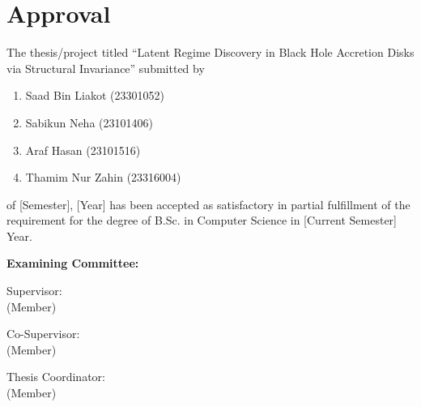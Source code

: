 \section*{Approval}

The thesis/project titled “Latent Regime Discovery in Black Hole Accretion Disks via Structural Invariance” submitted by 
\begin{enumerate}
  \item Saad Bin Liakot (23301052)
  \item Sabikun Neha (23101406)
  \item Araf Hasan (23101516)
  \item Thamim Nur Zahin (23316004)
\end{enumerate}

of [Semester], [Year] has been accepted as satisfactory in partial fulfillment of the requirement for the degree of B.Sc. in Computer Science in [Current Semester] Year. 

\vspace{0.5cm}
\textbf{Examining Committee:}

\vspace{1cm}

Supervisor:\\
(Member)
\begin{center}
    \hspace{7cm}  \hspace{1cm} 
\end{center}

Co-Supervisor:\\
(Member)
\begin{center}
    \hspace{7cm}  \hspace{1cm} 
\end{center}


Thesis Coordinator:\\
(Member)
\begin{center}
    \hspace{7cm}  \hspace{1cm} 
\end{center}

